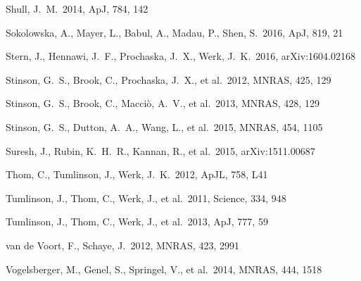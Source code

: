 \documentclass[useAMS,usenatbib]{mn2e}
\def \apj {ApJ}
\def \apjl {ApJL}
\def \mnras {MNRAS}
\begin{document}
\begin{thebibliography}{}
%
 Shull, J.~M.\ 2014, \apj, 784, 142

Sokolowska, A., Mayer, L., Babul, A., Madau, P., Shen, S.\ 2016, \apj, 819, 21

Stern, J., Hennawi, J.~F., Prochaska, J.~X., Werk, J.~K.\ 2016, arXiv:1604.02168

%
 Stinson, G.~S., Brook, C., Prochaska, J.~X., et al.\ 2012, \mnras, 425, 129

 Stinson, G.~S., Brook, 
C., Macci{\`o}, A.~V., et al.\ 2013, \mnras, 428, 129 

 Stinson, G.~S., Dutton, A.~A., Wang, L., et al.\ 2015, \mnras, 454, 1105 

%
 Suresh, J., Rubin, K.~H.~R., Kannan, R., et al.\ 2015, arXiv:1511.00687


Thom, C., Tumlinson, J., Werk, J.~K.\ 2012, \apjl, 758, L41

 Tumlinson, J., Thom, C., Werk, J., et al.\ 2011, Science, 334, 948

 Tumlinson, J., Thom, C., Werk, J., et al.\ 2013, \apj, 777, 59


 van de Voort, F., Schaye, J.\ 2012, \mnras, 423, 2991

 Vogelsberger, M., 
Genel, S., Springel, V., et al.\ 2014, \mnras, 444, 1518 



\end{thebibliography}
\end{document}
